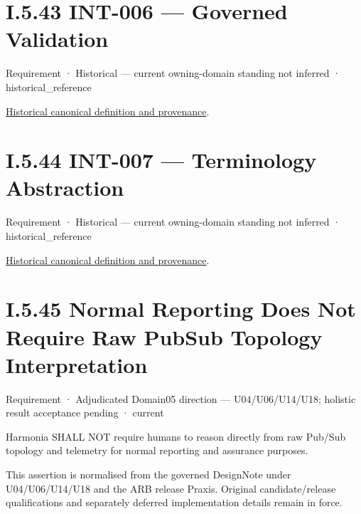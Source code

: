 \section*{I.5.43 INT-006 — Governed Validation}
\label{navigation:I.5.43}

\label{element:6c14251b5d4e4eff96d2fd812834d124}
{\small Requirement · Historical — current owning-domain standing not inferred · historical\_reference}\par
\href{../../../../continuum/motivation/requirement/6c14251b5d4e4eff96d2fd812834d124.md}{Historical canonical definition and provenance}.\par
\section*{I.5.44 INT-007 — Terminology Abstraction}
\label{navigation:I.5.44}

\label{element:6fe86be142044e5aa7720e2e6493a72a}
{\small Requirement · Historical — current owning-domain standing not inferred · historical\_reference}\par
\href{../../../../continuum/motivation/requirement/6fe86be142044e5aa7720e2e6493a72a.md}{Historical canonical definition and provenance}.\par
\section*{I.5.45 Normal Reporting Does Not Require Raw PubSub Topology Interpretation}
\label{navigation:I.5.45}

\label{element:aa569bb1448648f685bb73cf9c6563e3}
{\small Requirement · Adjudicated Domain05 direction — U04/U06/U14/U18; holistic result acceptance pending · current}\par

Harmonia SHALL NOT require humans to reason directly from raw Pub/Sub topology and telemetry for normal reporting and assurance purposes.



This assertion is normalised from the governed DesignNote under U04/U06/U14/U18 and the ARB release Praxis. Original candidate/release qualifications and separately deferred implementation details remain in force.



